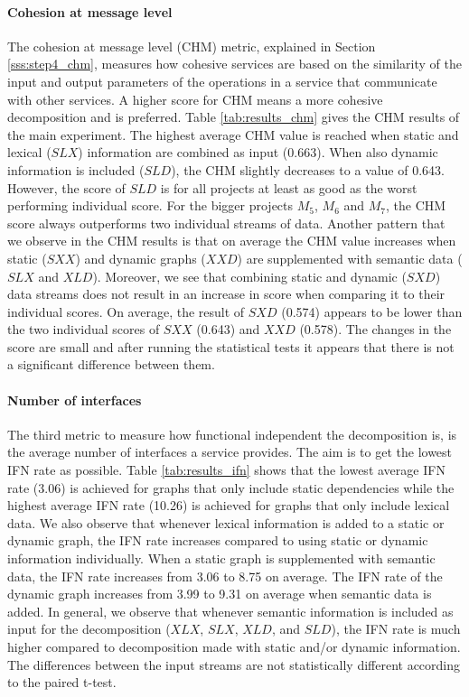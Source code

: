 \paragraph{Cohesion at message level}
The cohesion at message level (CHM) metric, explained in Section \ref{sss:step4_chm}, measures how cohesive services are based on the similarity of the input and output parameters of the operations in a service that communicate with other services. A higher score for CHM means a more cohesive decomposition and is preferred. Table \ref{tab:results_chm} gives the CHM results of the main experiment. The highest average CHM value is reached when static and lexical ($SLX$) information are combined as input (0.663). When also dynamic information is included ($SLD$), the CHM slightly decreases to a value of 0.643. However, the score of $SLD$ is for all projects at least as good as the worst performing individual score. For the bigger projects $M_5$, $M_6$ and $M_7$, the CHM score always outperforms two individual streams of data.
Another pattern that we observe in the CHM results is that on average the CHM value increases when static ($SXX$) and dynamic graphs ($XXD$) are supplemented with semantic data ($SLX$ and $XLD$). Moreover, we see that combining static and dynamic ($SXD$) data streams does not result in an increase in score when comparing it to their individual scores. On average, the result of $SXD$ (0.574) appears to be lower than the two individual scores of $SXX$ (0.643) and $XXD$ (0.578). The changes in the score are small and after running the statistical tests it appears that there is not a significant difference between them.



\paragraph{Number of interfaces}
The third metric to measure how functional independent the decomposition is, is the average number of interfaces a service provides. The aim is to get the lowest IFN rate as possible. Table \ref{tab:results_ifn} shows that the lowest average IFN rate (3.06) is achieved for graphs that only include static dependencies while the highest average IFN rate (10.26) is achieved for graphs that only include lexical data. We also observe that whenever lexical information is added to a static or dynamic graph, the IFN rate increases compared to using static or dynamic information individually. When a static graph is supplemented with semantic data, the IFN rate increases from 3.06 to 8.75 on average. The IFN rate of the dynamic graph increases from 3.99 to 9.31 on average when semantic data is added. In general, we observe that whenever semantic information is included as input for the decomposition ($XLX$, $SLX$, $XLD$, and $SLD$), the IFN rate is much higher compared to decomposition made with static and/or dynamic information. The differences between the input streams are not statistically different according to the paired t-test. 

